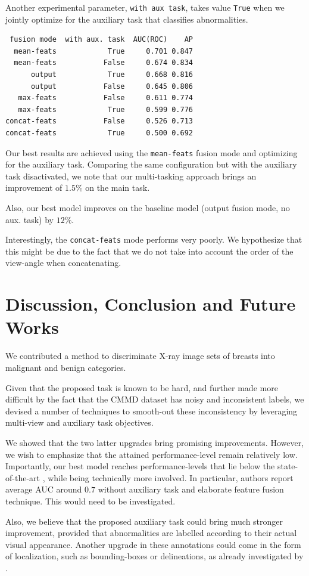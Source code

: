 \documentclass[11pt]{article}
\begin{document}
Another experimental parameter, \texttt{with aux task}, takes value \texttt{True} when we jointly optimize for the
auxiliary task that classifies abnormalities.

\begin{verbatim}
 fusion mode  with aux. task  AUC(ROC)    AP
  mean-feats            True     0.701 0.847
  mean-feats           False     0.674 0.834
      output            True     0.668 0.816
      output           False     0.645 0.806
   max-feats           False     0.611 0.774
   max-feats            True     0.599 0.776
concat-feats           False     0.526 0.713
concat-feats            True     0.500 0.692
\end{verbatim}


Our best results are achieved using the \texttt{mean-feats} fusion mode and
optimizing for the auxiliary task.
Comparing the same configuration but with the auxiliary task disactivated,
we note that our multi-tasking approach brings an improvement of \(1.5\%\) on the main task.

Also, our best model improves on the baseline model
(output fusion mode, no aux. task) by \(12\%\).

Interestingly, the \texttt{concat-feats} mode performs very poorly.
We hypothesize that this might be due to the fact
that we do not take into account the order of the view-angle when
concatenating.

\section{Discussion, Conclusion and Future Works}
\label{sec:orga52a732}

We contributed a method to discriminate X-ray image sets of breasts into malignant and benign
categories.

Given that the proposed task is known to be hard, and further made more difficult by
the fact that the CMMD dataset has noisy and inconsistent labels,
we devised a number of techniques to smooth-out these inconsistency by
leveraging multi-view and auxiliary task objectives.

We showed that the two latter upgrades bring promising improvements.
However, we wish to emphasize that the attained performance-level remain relatively low.
Importantly, our best model reaches performance-levels that lie
below the state-of-the-art \autocite{tardy22}, while being technically more involved.
In particular, authors report average AUC around \(0.7\) without auxiliary task
and elaborate feature fusion technique. This would need to be investigated.

Also, we believe that the proposed auxiliary task could bring much stronger
improvement, provided that abnormalities are labelled according to their actual
visual appearance. Another upgrade in these annotations could come in the form
of localization, such as bounding-boxes or delineations, as already investigated by \autocite{tang19}.



\printbibliography
\end{document}
